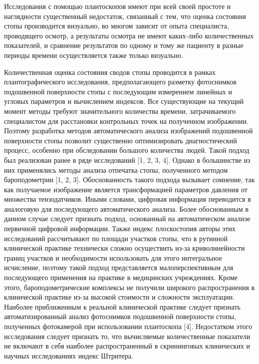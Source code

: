 \documentclass[coursework]{SCWorks}
\begin{document}
Исследования с помощью плантоскопов имеют при всей своей простоте и наглядности существенный недостаток, связанный с тем, что оценка состояния стопы производится визуально, во многом зависит от опыта специалиста, проводящего осмотр, а результаты осмотра не имеют каких-либо количественных показателей, и сравнение результатов по одному и тому же пациенту в разные периоды времени осуществляется также только визуально.

Количественная оценка состояния сводов стопы проводится в рамках плантографического исследования, предполагающего разметку фотоснимков подошвенной поверхности стопы с последующим измерением линейных и угловых параметров и вычислением индексов. Все существующие на текущий момент методы требуют значительного количества времени, затрачиваемого специалистом для расстановки контрольных точек на полученном изображении. Поэтому разработка методов автоматического анализа изображений подошвенной поверхности стопы позволит существенно оптимизировать диагностический процесс, особенно при обследовании большого количества людей. Такой подход был реализован ранее в ряде исследований [1, 2, 3, 4]. Однако в большинстве из них применялись методы анализа отпечатка стопы, полученного методом бароподометрии [1, 2, 3]. Обоснованность такого подхода вызывает сомнение, так как получаемое изображение является трансформацией параметров давления от множества тензодатчиков. Иными словами, цифровая информация переводится в аналоговую для последующего автоматического анализа. Более обоснованным в данном случае следует признать подход, основанный на автоматическом анализе первичной цифровой информации. Также индекс плоскостопия авторы этих исследований рассчитывают по площади участков стопы, что в рутинной клинической практике технически сложно осуществить из-за криволинейности границ участков и необходимости использовать для этого интегральное исчисление, поэтому такой подход представляется малоперспективным для последующего применения на практике в медицинских учреждениях. Кроме этого, бароподометрические комплексы не получили широкого распространения в клинической практике из-за высокой стоимости и сложности эксплуатации. Наиболее приближенным к реальной клинической практике следует признать автоматизированный анализ фотоснимков подошвенной поверхности стопы, полученных фотокамерой при использовании плантоскопа [4]. Недостатком этого исследования следует признать то, что вычисляемые количественные показатели не включают в себя наиболее распространенный в скрининговых клинических и научных исследованиях индекс Штритера.
\end{document}

